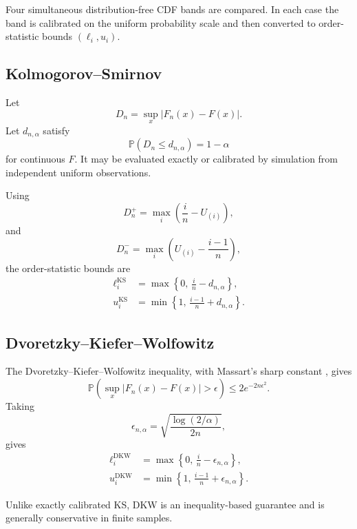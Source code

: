 \documentclass[11pt]{article}
\newcommand{\Pp}{\mathbb{P}}
\begin{document}
Four simultaneous distribution-free CDF bands are compared.  In each
case the band is calibrated on the uniform probability scale and then
converted to order-statistic bounds $(\ell_i,u_i)$.


\subsection{Kolmogorov--Smirnov}

Let
\[
    D_n
    =
    \sup_x
    |F_n(x)-F(x)|.
\]
Let $d_{n,\alpha}$ satisfy
\[
    \Pp(D_n\leq d_{n,\alpha})=1-\alpha
\]
for continuous $F$.  It may be evaluated exactly or calibrated by
simulation from independent uniform observations.

Using
\[
    D_n^+
    =
    \max_i
    \left(
        \frac{i}{n}-U_{(i)}
    \right),
\]
and
\[
    D_n^-
    =
    \max_i
    \left(
        U_{(i)}-\frac{i-1}{n}
    \right),
\]
the order-statistic bounds are
\begin{align}
    \ell_i^{\mathrm{KS}}
    &=
    \max
    \left\{
        0,\,
        \frac{i}{n}-d_{n,\alpha}
    \right\},
    \label{eq:kslower}
    \\
    u_i^{\mathrm{KS}}
    &=
    \min
    \left\{
        1,\,
        \frac{i-1}{n}+d_{n,\alpha}
    \right\}.
    \label{eq:ksupper}
\end{align}


\subsection{Dvoretzky--Kiefer--Wolfowitz}

The Dvoretzky--Kiefer--Wolfowitz inequality, with Massart's sharp
constant \cite{DKW1956,Massart1990}, gives
\[
    \Pp
    \left(
        \sup_x |F_n(x)-F(x)|>\epsilon
    \right)
    \leq
    2e^{-2n\epsilon^2}.
\]
Taking
\begin{equation}
    \epsilon_{n,\alpha}
    =
    \sqrt{
        \frac{\log(2/\alpha)}{2n}
    },
\end{equation}
gives
\begin{align}
    \ell_i^{\mathrm{DKW}}
    &=
    \max
    \left\{
        0,\,
        \frac{i}{n}-\epsilon_{n,\alpha}
    \right\},
    \\
    u_i^{\mathrm{DKW}}
    &=
    \min
    \left\{
        1,\,
        \frac{i-1}{n}+\epsilon_{n,\alpha}
    \right\}.
\end{align}

Unlike exactly calibrated KS, DKW is an inequality-based guarantee and
is generally conservative in finite samples.
\end{document}
